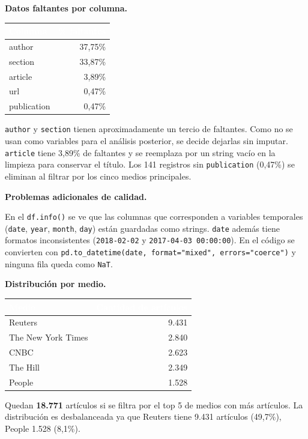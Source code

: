 \documentclass[a4paper,11pt]{article}
\newcommand{\hd}[1]{\textbf{\textcolor{white}{#1}}}
\newcommand{\filaCabecera}{\rowcolor{azulOscuro}}
\begin{document}
\textbf{Datos faltantes por columna.}

\begin{center}
\begin{tabular}{lr}
\toprule
\filaCabecera \hd{Columna} & \hd{\% faltantes}\\
\midrule
author      & 37,75\% \\
section     & 33,87\% \\
article     &  3,89\% \\
url         &  0,47\% \\
publication &  0,47\% \\
\bottomrule
\end{tabular}
\end{center}

\texttt{author} y \texttt{section} tienen aproximadamente un tercio de faltantes. Como no se usan como variables para el análisis posterior, se decide dejarlas sin imputar. \texttt{article} tiene 3,89\% de faltantes y se reemplaza por un string vacío en la limpieza para conservar el título. Los 141 registros sin \texttt{publication} (0,47\%) se eliminan al filtrar por los cinco medios principales.

\textbf{Problemas adicionales de calidad.} 

En el \texttt{df.info()} se ve que las columnas que corresponden a variables temporales (\texttt{date}, \texttt{year}, \texttt{month}, \texttt{day}) están guardadas como strings. \texttt{date} además tiene formatos inconsistentes (\texttt{2018-02-02} y \texttt{2017-04-03 00:00:00}). En el código se convierten con \texttt{pd.to\_datetime(date, format="mixed", errors="coerce")} y ninguna fila queda como \texttt{NaT}.

\textbf{Distribución por medio.}

\begin{center}
\begin{tabular}{lr}
\toprule
\filaCabecera \hd{Medio} & \hd{Cantidad de artículos}\\
\midrule
Reuters            & 9.431 \\
The New York Times & 2.840 \\
CNBC               & 2.623 \\
The Hill           & 2.349 \\
People             & 1.528 \\
\bottomrule
\end{tabular}
\end{center}

Quedan \textbf{18.771} artículos si se filtra por el top 5 de medios con más artículos. La distribución es desbalanceada ya que Reuters tiene 9.431 artículos (49,7\%), People 1.528 (8,1\%).
\end{document}
